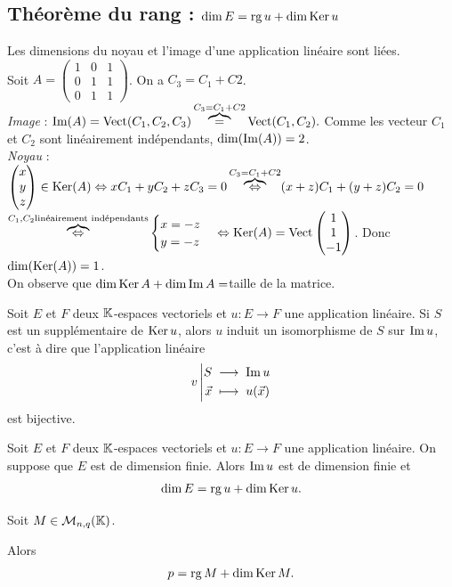 \documentclass{book}
\begin{document}
\subsection{Théorème du rang : $\dim E = \operatorname{rg} u + \dim \operatorname{Ker} u$}
Les dimensions du noyau et l'image d'une application linéaire sont liées.\\
Soit $A=\begin{pmatrix} 1 &  0 &1\\ 0 &1 &1\\ 0 &1&1\end{pmatrix}$. On a $C_3=C_1+C2$.\\
\textit{Image}  : $\operatorname{Im}(A)=\mathrm{Vect}(C_1,C_2,C_3)\overbrace{=}^{C_3=C_1+C2}\mathrm{Vect}(C_1,C_2).$ Comme les vecteur $C_1$ et $C_2$ sont linéairement indépendants, $\dim (\operatorname{Im}(A))=2$.\\
\textit{Noyau}  : $\begin{pmatrix}x\\y\\z \end{pmatrix}\in \operatorname{Ker}(A)\Leftrightarrow xC_1 + yC_2 + zC_3= 0\overbrace{\Leftrightarrow}^{C_3=C_1+C2} (x+z)C_1 + (y+z)C_2 = 0$ \\$ \overbrace{\Leftrightarrow}^{C_1,C_2\text{linéairement indépendants} }\begin{cases}x=-z\\y=-z\end{cases} \Leftrightarrow \operatorname{Ker}(A)= \mathrm{Vect} \begin{pmatrix}1\\1\\-1 \end{pmatrix}$. Donc $\dim (\operatorname{Ker}(A))=1$.\\
On observe que $\dim \operatorname{Ker} A +\dim \operatorname{Im} A =$taille de la matrice. 


\begin{Proposition}[Factorisation]
Soit $E$ et $F$ deux $\mathbb{K} $-espaces vectoriels  et $u:E\to F$ une application linéaire.
Si $S$ est un supplémentaire de $\operatorname{Ker} u$, alors $u$ induit un isomorphisme de $S$ sur $\operatorname{Im} u$,
c'est à dire que l'application linéaire
\[ {v}\left|\begin{aligned}{S}&\;\longrightarrow\;{\operatorname{Im} u}\\{\vec{x}}&\;\longmapsto\;{u(\vec{x})}\end{aligned}\right. \]
est bijective.
\end{Proposition}
\begin{Theoreme}

Soit $E$ et $F$ deux $\mathbb{K} $-espaces vectoriels  et $u:E\to F$ une application linéaire.
On suppose que $E$ est de dimension finie.
Alors $\operatorname{Im} u$ est de dimension finie et
\[ \dim E = \operatorname{rg} u + \dim \operatorname{Ker} u. \]
\end{Theoreme}
\begin{Theoreme}

Soit $M \in   \mathcal{M}_{n,q}(\mathbb{K}) $.

Alors 
\[ p = \operatorname{rg} M + \dim \operatorname{Ker} M. \]
\end{Theoreme}
\end{document}
